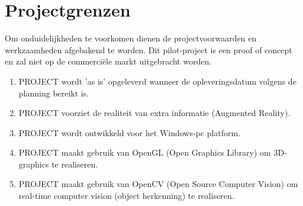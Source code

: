 \chapter{Projectgrenzen} \label{cha:projectgrenzen}
Om onduidelijkheden te voorkomen dienen de projectvoorwaarden en werkzaamheden afgebakend te worden. Dit pilot-project is een proof of concept en zal niet op de commerciële markt uitgebracht worden.
\\
\begin{enumerate}
  \item PROJECT wordt 'as is' opgeleverd wanneer de opleveringsdatum volgens de planning bereikt is.
  \item PROJECT voorziet de realiteit van extra informatie (Augmented Reality).
  \item PROJECT wordt ontwikkeld voor het Windows-pc platform.
  \item PROJECT maakt gebruik van OpenGL (Open Graphics Library) om 3D-graphics te realiseren.
  \item PROJECT maakt gebruik van OpenCV (Open Source Computer Vision) om real-time computer vision (object herkenning) te realiseren.
\end{enumerate}